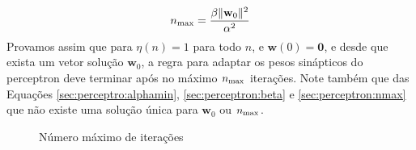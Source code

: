   \begin{equation}\label{sec:perceptron:nmax}
    n_{\rm max}=\frac{\beta\Vert\textbf{w}_0\Vert^2}{\alpha^2}
  \end{equation}
  Provamos assim que para $\eta(n)=1$ para todo $n$, e $\textbf{w}(0)=\textbf{0}$, e desde que exista um vetor solução $\textbf{w}_0$, a regra para adaptar os pesos sinápticos do perceptron deve terminar após no máximo $n_{\rm max}$ iterações. Note também que das Equações \ref{sec:perceptro:alphamin}, \ref{sec:perceptron:beta} e \ref{sec:perceptron:nmax} que não existe uma solução única para $\textbf{w}_0$ ou $n_{\rm max}$.



  \begin{figure}[!htpb] 
    \caption{Número máximo de iterações}
    \label{sec:perceptron:demo}
  \end{figure}

  \renewcommand{\algorithmicrequire}{\textbf{Input:}}
  \renewcommand{\algorithmicensure}{\textbf{Output:}}

